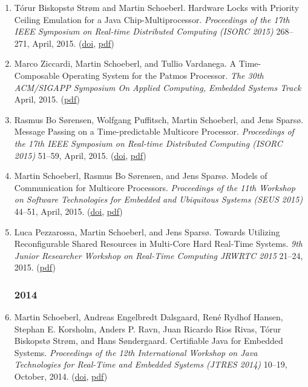 \begin{enumerate}
\item T{\'o}rur Biskopst{\o} Str{\o}m and Martin Schoeberl.
 Hardware Locks with Priority Ceiling Emulation for a Java Chip-Multiprocessor.
 \emph{Proceedings of the 17th IEEE Symposium on Real-time Distributed Computing (ISORC 2015)} 268--271, April, 2015.
(\href{http://dx.doi.org/10.1109/ISORC.2015.33}{doi}, \href{http://www.jopdesign.com/doc/joppce-short.pdf}{pdf})

\item Marco Ziccardi, Martin Schoeberl, and Tullio Vardanega.
 A Time-Composable Operating System for the Patmos Processor.
 \emph{The 30th ACM/SIGAPP Symposium On Applied Computing, Embedded Systems Track} April, 2015.
(\href{http://www.jopdesign.com/doc/ospat.pdf}{pdf})

\item Rasmus Bo S{\o}rensen, Wolfgang Puffitsch, Martin Schoeberl, and Jens Spars{\o}.
 Message Passing on a Time-predictable Multicore Processor.
 \emph{Proceedings of the 17th IEEE Symposium on Real-time Distributed Computing (ISORC 2015)} 51--59, April, 2015.
(\href{http://dx.doi.org/10.1109/ISORC.2015.15}{doi}, \href{http://www.jopdesign.com/doc/rt-mpi.pdf}{pdf})

\item Martin Schoeberl, Rasmus Bo S{\o}rensen, and Jens Spars{\o}.
 Models of Communication for Multicore Processors.
 \emph{Proceedings of the 11th Workshop on Software Technologies for Embedded and Ubiquitous Systems (SEUS 2015)} 44--51, April, 2015.
(\href{http://dx.doi.org/10.1109/ISORCW.2015.57}{doi}, \href{http://www.jopdesign.com/doc/modcomm.pdf}{pdf})

\item Luca Pezzarossa, Martin Schoeberl, and Jens Spars{\o}.
 Towards Utilizing Reconfigurable Shared Resources in Multi-Core Hard Real-Time Systems.
 \emph{9th Junior Researcher Workshop on Real-Time Computing JRWRTC 2015} 21--24, 2015.
(\href{http://www.jopdesign.com/doc/dpr-mcp.pdf}{pdf})


\subsubsection*{2014}

\item Martin Schoeberl, Andreas Engelbredt Dalsgaard, Ren\'{e} Rydhof Hansen, Stephan E. Korsholm, Anders P. Ravn, Juan Ricardo Rios Rivas, T\'{o}rur Biskopst{\o} Str{\o}m, and Hans S{\o}ndergaard.
 Certifiable Java for Embedded Systems.
 \emph{Proceedings of the 12th International Workshop on Java Technologies for Real-Time and Embedded Systems (JTRES 2014)} 10--19, October, 2014.
(\href{http://dx.doi.org/10.1145/2661020.2661025}{doi}, \href{http://www.jopdesign.com/doc/cj4es.pdf}{pdf})


\end{enumerate}
